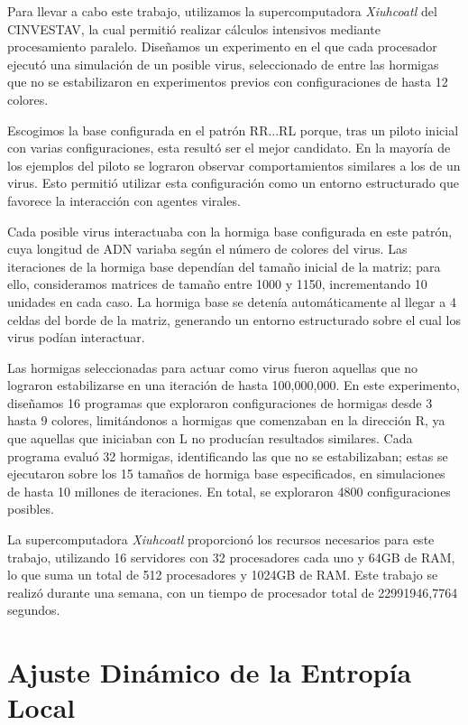 \documentclass[twocolumn]{article}
\begin{document}
Para llevar a cabo este trabajo, utilizamos la supercomputadora \textit{Xiuhcoatl} del CINVESTAV, la cual permitió realizar cálculos intensivos mediante procesamiento paralelo. Diseñamos un experimento en el que cada procesador ejecutó una simulación de un posible virus, seleccionado de entre las hormigas que no se estabilizaron en experimentos previos con configuraciones de hasta 12 colores.

Escogimos la base configurada en el patrón RR...RL porque, tras un piloto inicial con varias configuraciones, esta resultó ser el mejor candidato. En la mayoría de los ejemplos del piloto se lograron observar comportamientos similares a los de un virus. Esto permitió utilizar esta configuración como un entorno estructurado que favorece la interacción con agentes virales.

Cada posible virus interactuaba con la hormiga base configurada en este patrón, cuya longitud de ADN variaba según el número de colores del virus. Las iteraciones de la hormiga base dependían del tamaño inicial de la matriz; para ello, consideramos matrices de tamaño entre 1000 y 1150, incrementando 10 unidades en cada caso. La hormiga base se detenía automáticamente al llegar a 4 celdas del borde de la matriz, generando un entorno estructurado sobre el cual los virus podían interactuar.

Las hormigas seleccionadas para actuar como virus fueron aquellas que no lograron estabilizarse en una iteración de hasta 100,000,000. En este experimento, diseñamos 16 programas que exploraron configuraciones de hormigas desde 3 hasta 9 colores, limitándonos a hormigas que comenzaban en la dirección R, ya que aquellas que iniciaban con L no producían resultados similares. Cada programa evaluó 32 hormigas, identificando las que no se estabilizaban; estas se ejecutaron sobre los 15 tamaños de hormiga base especificados, en simulaciones de hasta 10 millones de iteraciones. En total, se exploraron 4800 configuraciones posibles.

La supercomputadora \textit{Xiuhcoatl} proporcionó los recursos necesarios para este trabajo, utilizando 16 servidores con 32 procesadores cada uno y 64GB de RAM, lo que suma un total de 512 procesadores y 1024GB de RAM. Este trabajo se realizó durante una semana, con un tiempo de procesador total de 22991946,7764 segundos.


\section{Ajuste Dinámico de la Entropía Local}
\end{document}
